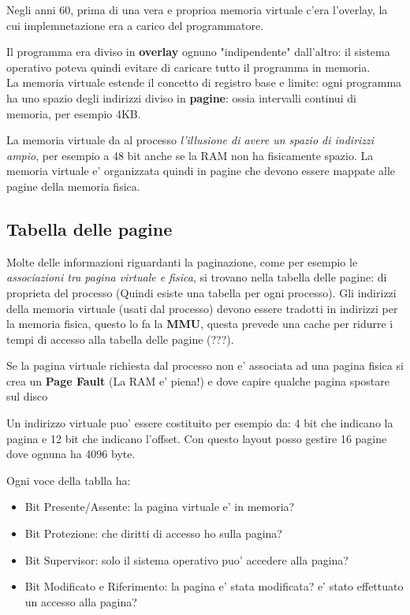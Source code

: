 Negli anni 60, prima di una vera e proprioa memoria virtuale c'era l'overlay,
la cui implemnetazione era a carico del programmatore. 

Il programma era diviso in \textbf{overlay} ognuno "indipendente" dall'altro: il 
sistema operativo poteva quindi evitare di caricare tutto il programma in memoria. \\

La memoria virtuale estende il concetto di registro base e limite: ogni programma ha uno spazio degli
indirizzi diviso in \textbf{pagine}: ossia intervalli continui di memoria, per esempio 4KB.

La memoria virtuale da al processo \textit{l'illusione di avere un spazio di indirizzi ampio}, per esempio a 48 bit
anche se la RAM non ha fisicamente spazio. La memoria virtuale e' organizzata quindi in pagine che devono essere mappate 
alle pagine della memoria fisica. \\

\subsection{Tabella delle pagine}
    Molte delle informazioni riguardanti la paginazione, come per esempio
    le \textit{associazioni tra pagina virtuale e fisica}, si trovano nella tabella delle pagine: di proprieta del processo (Quindi esiste una tabella per ogni processo).
    Gli indirizzi della memoria virtuale (usati dal processo) devono essere tradotti in indirizzi per la memoria fisica, questo
    lo fa la \textbf{MMU}, questa prevede una cache per ridurre i tempi di accesso alla tabella delle pagine (???).

    Se la pagina virtuale richiesta dal processo non e' associata ad una pagina fisica si crea un \textbf{Page Fault} (La RAM e' piena!)
    e dove capire qualche pagina spostare sul disco

    Un indirizzo virtuale puo' essere costituito per esempio da: 4 bit che indicano la pagina e 12 bit che indicano l'offset.
    Con questo layout posso gestire 16 pagine dove ognuna ha 4096 byte.

    Ogni voce della tablla ha:
    \begin{itemize}
        \item Bit Presente/Assente: la pagina virtuale e' in memoria?
        \item Bit Protezione: che diritti di accesso ho sulla pagina?
        \item Bit Supervisor: solo il sistema operativo puo' accedere alla pagina?
        \item Bit Modificato e Riferimento: la pagina e' stata modificata? e' stato effettuato 
        un accesso alla pagina?
    \end{itemize}


